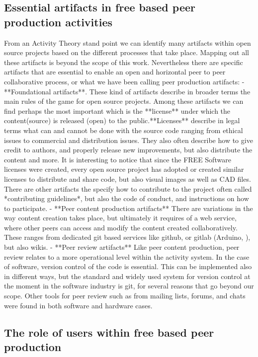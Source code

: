 \documentclass{ICED-Paper}%
\begin{document}
\subsection{Essential artifacts in free based peer production activities}
From an Activity Theory stand point we can identify many artifacts within open source projects based on the different processes that take place. Mapping out all these artifacts is beyond the scope of this work. Nevertheless there are specific artifacts that are essential to enable an open and horizontal peer to peer collaborative process, or what we have been calling peer production artifacts:
- **Foundational artifacts**. These kind of artifacts describe in broader terms the main rules of the game for open source projects. Among these artifacts we can find perhaps the most important which is the **license** under which the content(source) is released (open) to the public.**Licenses** describe in legal terms what can and cannot be done with the source code ranging from ethical issues to commercial and distribution issues. They also often describe how to give credit to authors, and properly
release new improvements, but also distribute the content and more. It is interesting to notice that since the FREE Software licenses were created, every open source project has adopted or created similar licenses to distribute and share code, but also visual images as well as CAD files. There are other artifacts the specify how to contribute to the project often called *contributing guidelines*, but also the code of conduct, and instructions on how to participate.
- **Peer content production artifacts** There are variations in the way content creation takes place, but ultimately it requires of a web service, where other peers can access and modify the content created collaboratively. These ranges from dedicated git based services like github, or gitlab (Arduino, ), but also wikis.
- **Peer review artifacts** Like peer content production, peer review relates to a more operational level within the activity system. In the case of software, version control of the code is essential. This can be implemented also in different ways, but the standard and widely used system for version control at the moment in the software industry is git, for several reasons that go beyond our scope. Other tools for peer review such as from mailing lists, forums, and chats were found in both software and hardware cases.

\subsection{The role of users within free based peer production}
\end{document}
